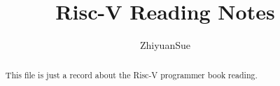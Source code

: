 \documentclass{article}
\begin{document}
\title{Risc-V Reading Notes}
\author{ZhiyuanSue}
\maketitle

\begin{abstract}
This file is just a record about the Risc-V programmer book reading.
\end{abstract}

\newpage


\newpage
\end{document}

